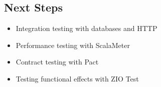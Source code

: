 \documentclass[12pt,a4paper]{article}
\begin{document}
\subsection{Next Steps}
\begin{itemize}
  \item Integration testing with databases and HTTP
  \item Performance testing with ScalaMeter
  \item Contract testing with Pact
  \item Testing functional effects with ZIO Test
\end{itemize}
\end{document}
